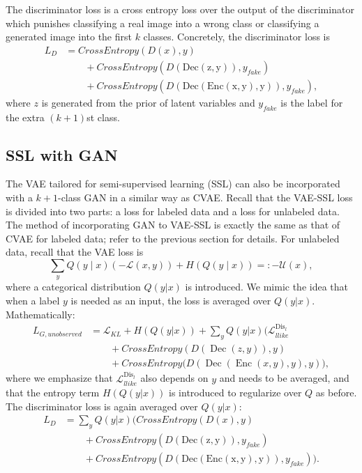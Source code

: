 \documentclass[10pt]{article}
\newcommand{\op}[1]{\operatorname{#1}}
\begin{document}
The discriminator loss is a cross entropy loss over the output of the discriminator which punishes classifying a real image into a wrong class or classifying a generated image into the first $k$ classes. Concretely, the discriminator loss is
\begin{align}
L_D &= CrossEntropy(D(x),y)\\
&\qquad + CrossEntropy(D(\op{Dec(z,y)}),y_{fake})\\
&\qquad +CrossEntropy(D(\op{Dec(Enc(x,y),y)}),y_{fake}),
\end{align}
where $z$ is generated from the prior of latent variables and $y_{fake}$ is the label for the extra $(k+1)$st class.


\subsection{SSL with GAN}\label{sub:ssl_gan}
The VAE tailored for semi-supervised learning (SSL) can also be incorporated with a $k+1$-class GAN in a similar way as CVAE. Recall that the VAE-SSL loss is divided into two parts: a loss for labeled data and a loss for unlabeled data. The method of incorporating GAN to VAE-SSL is exactly the same as that of CVAE for labeled data; refer to the previous section for details. For unlabeled data, recall that the VAE loss is
$$
\sum_y Q(y \mid x) (-\mathcal{L}(x,y)) + H(Q(y \mid x)) =: -\mathcal{U}(x),
$$
where a categorical distribution $Q(y|x)$ is introduced. We mimic the idea that when a label $y$ is needed as an input, the loss is averaged over $Q(y|x)$. Mathematically:
\begin{align}
L_{G,unobserved} &= \mathcal{L}_{KL} + H(Q(y|x))+\sum_y Q(y|x)\Big(\mathcal{L}_{llike}^{\op{Dis}_l} \\
&\qquad +CrossEntropy(D(\op{Dec}(z,y)),y)\\
&\qquad +CrossEntropy(D(\op{Dec}(\op{Enc}(x,y),y),y)\Big),
\end{align}
where we emphasize that $\mathcal{L}_{llike}^{\op{Dis}_l}$ also depends on $y$ and needs to be averaged, and that the entropy term $H(Q(y|x))$ is introduced to regularize over $Q$ as before.
The discriminator loss is again averaged over $Q(y|x)$:
\begin{align}
L_D &= \sum_y Q(y|x)\big(CrossEntropy(D(x),y)\\
&\qquad + CrossEntropy(D(\op{Dec(z,y)}),y_{fake}) \\
&\qquad +CrossEntropy(D(\op{Dec(Enc(x,y),y)}),y_{fake})\big).
\end{align}
\end{document}
